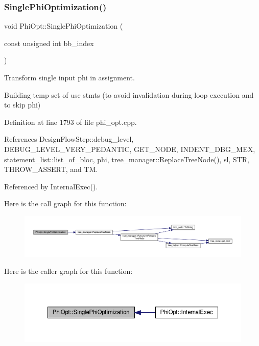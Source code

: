 \subsubsection{\texorpdfstring{Single\+Phi\+Optimization()}{SinglePhiOptimization()}}
{\footnotesize\ttfamily void Phi\+Opt\+::\+Single\+Phi\+Optimization (\begin{DoxyParamCaption}\item[{const unsigned int}]{bb\+\_\+index }\end{DoxyParamCaption})\hspace{0.3cm}{\ttfamily [private]}}



Transform single input phi in assignment. 

Building temp set of use stmts (to avoid invalidation during loop execution and to skip phi) 

Definition at line 1793 of file phi\+\_\+opt.\+cpp.



References Design\+Flow\+Step\+::debug\+\_\+level, D\+E\+B\+U\+G\+\_\+\+L\+E\+V\+E\+L\+\_\+\+V\+E\+R\+Y\+\_\+\+P\+E\+D\+A\+N\+T\+IC, G\+E\+T\+\_\+\+N\+O\+DE, I\+N\+D\+E\+N\+T\+\_\+\+D\+B\+G\+\_\+\+M\+EX, statement\+\_\+list\+::list\+\_\+of\+\_\+bloc, phi, tree\+\_\+manager\+::\+Replace\+Tree\+Node(), sl, S\+TR, T\+H\+R\+O\+W\+\_\+\+A\+S\+S\+E\+RT, and TM.



Referenced by Internal\+Exec().

Here is the call graph for this function\+:
\nopagebreak
\begin{figure}[H]
\begin{center}
\leavevmode
\includegraphics[width=350pt]{dc/ddf/classPhiOpt_a1914c66ecf01c9ae565631219c6a60ca_cgraph}
\end{center}
\end{figure}
Here is the caller graph for this function\+:
\nopagebreak
\begin{figure}[H]
\begin{center}
\leavevmode
\includegraphics[width=350pt]{dc/ddf/classPhiOpt_a1914c66ecf01c9ae565631219c6a60ca_icgraph}
\end{center}
\end{figure}


